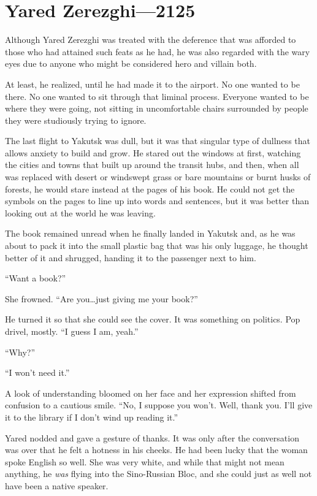 \hypertarget{yared-zerezghi-2125}{%
\chapter{Yared Zerezghi—2125}\label{yared-zerezghi-2125}}

Although Yared Zerezghi was treated with the deference that was afforded to those who had attained such feats as he had, he was also regarded with the wary eyes due to anyone who might be considered hero and villain both.

At least, he realized, until he had made it to the airport. No one wanted to be there. No one wanted to sit through that liminal process. Everyone wanted to be where they were going, not sitting in uncomfortable chairs surrounded by people they were studiously trying to ignore.

The last flight to Yakutsk was dull, but it was that singular type of dullness that allows anxiety to build and grow. He stared out the windows at first, watching the cities and towns that built up around the transit hubs, and then, when all was replaced with desert or windswept grass or bare mountains or burnt husks of forests, he would stare instead at the pages of his book. He could not get the symbols on the pages to line up into words and sentences, but it was better than looking out at the world he was leaving.

The book remained unread when he finally landed in Yakutsk and, as he was about to pack it into the small plastic bag that was his only luggage, he thought better of it and shrugged, handing it to the passenger next to him.

``Want a book?''

She frowned. ``Are you\ldots just giving me your book?''

He turned it so that she could see the cover. It was something on politics. Pop drivel, mostly. ``I guess I am, yeah.''

``Why?''

``I won't need it.''

A look of understanding bloomed on her face and her expression shifted from confusion to a cautious smile. ``No, I suppose you won't. Well, thank you. I'll give it to the library if I don't wind up reading it.''

Yared nodded and gave a gesture of thanks. It was only after the conversation was over that he felt a hotness in his cheeks. He had been lucky that the woman spoke English so well. She was very white, and while that might not mean anything, he \emph{was} flying into the Sino-Russian Bloc, and she could just as well not have been a native speaker.

